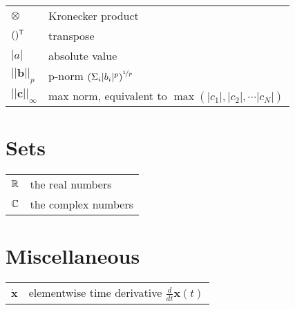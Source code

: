 \begin{tabular}{ p{2cm} l }
    $\otimes$   & Kronecker product \\
    $()^\mathsf{T}$   & transpose \\
    $|a|$       & absolute value \\
    $||\bm{b}||_p$      & p-norm $\left( \Sigma_i |b_i|^p \right)^{\nicefrac{1}{p}}$ \\
    $||\bm{c}||_{\infty}$        & max norm, equivalent to $\max(|c_1|,|c_2|, \cdots |c_N|)$ \\

\end{tabular}


\section*{Sets}
\begin{tabular}{ p{2cm} l }
    $\mathbb{R}$    & the real numbers \\
    $\mathbb{C}$    & the complex numbers
\end{tabular}

\section*{Miscellaneous}
\begin{tabular}{ p{2cm} l }
    $\dot{\bm{x}}$    & elementwise time derivative $\frac{d}{dt}\bm{x}(t)$ \\

\end{tabular}

